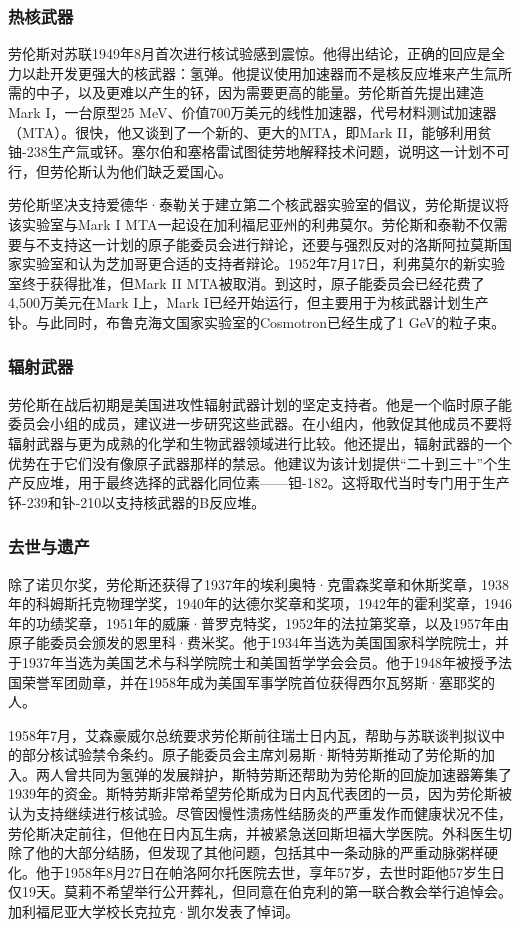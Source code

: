 \subsubsection{热核武器}
劳伦斯对苏联1949年8月首次进行核试验感到震惊。他得出结论，正确的回应是全力以赴开发更强大的核武器：氢弹。他提议使用加速器而不是核反应堆来产生氚所需的中子，以及更难以产生的钚，因为需要更高的能量。劳伦斯首先提出建造Mark I，一台原型25 MeV、价值700万美元的线性加速器，代号材料测试加速器（MTA）。很快，他又谈到了一个新的、更大的MTA，即Mark II，能够利用贫铀-238生产氚或钚。塞尔伯和塞格雷试图徒劳地解释技术问题，说明这一计划不可行，但劳伦斯认为他们缺乏爱国心。

劳伦斯坚决支持爱德华·泰勒关于建立第二个核武器实验室的倡议，劳伦斯提议将该实验室与Mark I MTA一起设在加利福尼亚州的利弗莫尔。劳伦斯和泰勒不仅需要与不支持这一计划的原子能委员会进行辩论，还要与强烈反对的洛斯阿拉莫斯国家实验室和认为芝加哥更合适的支持者辩论。1952年7月17日，利弗莫尔的新实验室终于获得批准，但Mark II MTA被取消。到这时，原子能委员会已经花费了4,500万美元在Mark I上，Mark I已经开始运行，但主要用于为核武器计划生产钋。与此同时，布鲁克海文国家实验室的Cosmotron已经生成了1 GeV的粒子束。
\subsubsection{辐射武器}
劳伦斯在战后初期是美国进攻性辐射武器计划的坚定支持者。他是一个临时原子能委员会小组的成员，建议进一步研究这些武器。在小组内，他敦促其他成员不要将辐射武器与更为成熟的化学和生物武器领域进行比较。他还提出，辐射武器的一个优势在于它们没有像原子武器那样的禁忌。他建议为该计划提供“二十到三十”个生产反应堆，用于最终选择的武器化同位素——钽-182。这将取代当时专门用于生产钚-239和钋-210以支持核武器的B反应堆。
\subsubsection{去世与遗产}
除了诺贝尔奖，劳伦斯还获得了1937年的埃利奥特·克雷森奖章和休斯奖章，1938年的科姆斯托克物理学奖，1940年的达德尔奖章和奖项，1942年的霍利奖章，1946年的功绩奖章，1951年的威廉·普罗克特奖，1952年的法拉第奖章，以及1957年由原子能委员会颁发的恩里科·费米奖。他于1934年当选为美国国家科学院院士，并于1937年当选为美国艺术与科学院院士和美国哲学学会会员。他于1948年被授予法国荣誉军团勋章，并在1958年成为美国军事学院首位获得西尔瓦努斯·塞耶奖的人。

1958年7月，艾森豪威尔总统要求劳伦斯前往瑞士日内瓦，帮助与苏联谈判拟议中的部分核试验禁令条约。原子能委员会主席刘易斯·斯特劳斯推动了劳伦斯的加入。两人曾共同为氢弹的发展辩护，斯特劳斯还帮助为劳伦斯的回旋加速器筹集了1939年的资金。斯特劳斯非常希望劳伦斯成为日内瓦代表团的一员，因为劳伦斯被认为支持继续进行核试验。尽管因慢性溃疡性结肠炎的严重发作而健康状况不佳，劳伦斯决定前往，但他在日内瓦生病，并被紧急送回斯坦福大学医院。外科医生切除了他的大部分结肠，但发现了其他问题，包括其中一条动脉的严重动脉粥样硬化。他于1958年8月27日在帕洛阿尔托医院去世，享年57岁，去世时距他57岁生日仅19天。莫莉不希望举行公开葬礼，但同意在伯克利的第一联合教会举行追悼会。加利福尼亚大学校长克拉克·凯尔发表了悼词。

